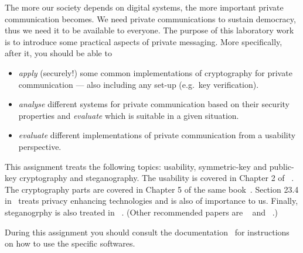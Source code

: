 The more our society depends on digital systems, the more important private 
communication becomes.
We need private communications to sustain democracy, thus we need it to be 
available to everyone.
The purpose of this laboratory work is to introduce some practical aspects of 
private messaging.
More specifically, after it, you should be able to
\begin{itemize}
  \item \emph{apply} (securely!) some common implementations of cryptography 
    for private communication --- also including any set-up (e.g.\ key 
    verification).
  \item \emph{analyse} different systems for private communication based on 
    their security properties and \emph{evaluate} which is suitable in a given 
    situation.
  \item \emph{evaluate} different implementations of private communication from 
    a usability perspective.
\end{itemize}

This assignment treats the following topics: usability, symmetric-key and 
public-key cryptography and steganography.
The usability is covered in Chapter 2 of 
~\cite{Anderson2008sea}.
The cryptography parts are covered in Chapter 5 of the same 
book~\cite{Anderson2008sea}.
Section 23.4 in~\cite{Anderson2008sea} treats privacy enhancing technologies 
and is also of importance to us.
Finally, steganogrphy is also treated in 
~\cite{johnson1998exploring}.
(Other recommended papers are 
~\cite{anderson1998limits} and 
~\cite{provos2003hide}.)

During this assignment you should consult the 
documentation~\cite{gpgdoc,gpg4windoc,outguess,openpuffdoc} for instructions on
how to use the specific softwares.
